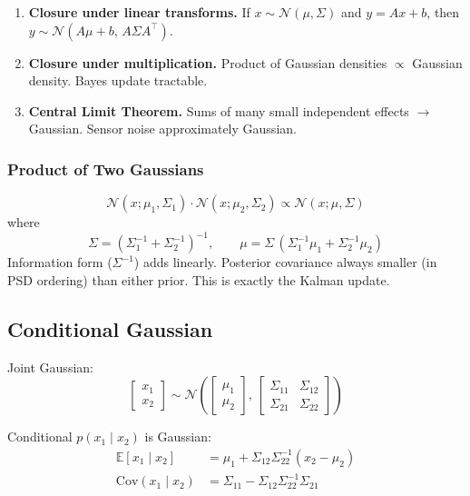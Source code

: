 \documentclass[11pt,a4paper]{article}
\begin{document}
\begin{enumerate}
\item \textbf{Closure under linear transforms.} If $x \sim \mathcal{N}(\mu, \Sigma)$ and $y = Ax + b$, then $y \sim \mathcal{N}(A\mu + b,\, A\Sigma A^\top)$.

\item \textbf{Closure under multiplication.} Product of Gaussian densities $\propto$ Gaussian density. Bayes update tractable.

\item \textbf{Central Limit Theorem.} Sums of many small independent effects $\to$ Gaussian. Sensor noise approximately Gaussian.
\end{enumerate}

\subsubsection{Product of Two Gaussians}

\begin{equation}
\mathcal{N}(x;\mu_1, \Sigma_1) \cdot \mathcal{N}(x;\mu_2, \Sigma_2) \propto \mathcal{N}(x;\mu, \Sigma)
\end{equation}
where
\[
\Sigma = (\Sigma_1^{-1} + \Sigma_2^{-1})^{-1}, \qquad \mu = \Sigma\,(\Sigma_1^{-1}\mu_1 + \Sigma_2^{-1}\mu_2)
\]
Information form ($\Sigma^{-1}$) adds linearly. Posterior covariance always smaller (in PSD ordering) than either prior. This is exactly the Kalman update.

\subsection{Conditional Gaussian}

Joint Gaussian:
\[
\begin{bmatrix}x_1 \\ x_2\end{bmatrix} \sim \mathcal{N}\!\left(\begin{bmatrix}\mu_1 \\ \mu_2\end{bmatrix},\, \begin{bmatrix}\Sigma_{11} & \Sigma_{12} \\ \Sigma_{21} & \Sigma_{22}\end{bmatrix}\right)
\]

Conditional $p(x_1 \mid x_2)$ is Gaussian:
\begin{align}
\mathbb{E}[x_1 \mid x_2] &= \mu_1 + \Sigma_{12}\Sigma_{22}^{-1}(x_2 - \mu_2) \\
\mathrm{Cov}(x_1 \mid x_2) &= \Sigma_{11} - \Sigma_{12}\Sigma_{22}^{-1}\Sigma_{21}
\end{align}
\end{document}
